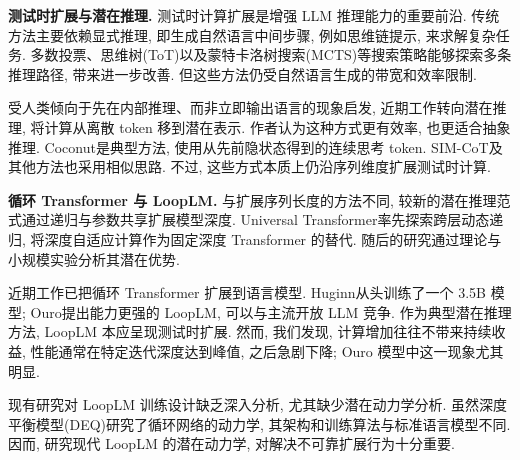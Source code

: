 \label{stars-sec-2}
\noindent\textbf{测试时扩展与潜在推理.}
测试时计算扩展是增强 LLM 推理能力的重要前沿\cite{stars-zhang2025survey}. 传统方法主要依赖显式推理, 即生成自然语言中间步骤, 例如思维链提示\cite{stars-wei2022chain}, 来求解复杂任务. 多数投票\cite{stars-wang2022selfconsistency}、思维树(ToT)\cite{stars-tot}以及蒙特卡洛树搜索(MCTS)\cite{stars-yang2022chain}等搜索策略能够探索多条推理路径, 带来进一步改善. 但这些方法仍受自然语言生成的带宽和效率限制.

受人类倾向于先在内部推理、而非立即输出语言的现象启发\cite{stars-zelikman2024quiet}, 近期工作转向潜在推理, 将计算从离散 token 移到潜在表示\cite{stars-zhu2025survey}. 作者认为这种方式更有效率, 也更适合抽象推理. Coconut\cite{stars-hao2024training}是典型方法, 使用从先前隐状态得到的连续思考 token. SIM-CoT\cite{stars-wei2025sim}及其他方法\cite{stars-mohtashami2023cotformer,stars-shen2025codi,stars-cheng2024compressed,stars-zhang2025lightthinker}也采用相似思路. 不过, 这些方式本质上仍沿序列维度扩展测试时计算.

\noindent\textbf{循环 Transformer 与 LoopLM.}
与扩展序列长度的方法不同, 较新的潜在推理范式通过递归与参数共享扩展模型深度. Universal Transformer\cite{stars-dehghani2018universal}率先探索跨层动态递归, 将深度自适应计算作为固定深度 Transformer 的替代. 随后的研究\cite{stars-giannou2023looped,stars-yang2023looped,stars-fan2024looped}通过理论与小规模实验分析其潜在优势.

近期工作\cite{stars-geiping2025scaling,stars-zhu2025scaling,stars-du2025latent,stars-mcleish2025teaching}已把循环 Transformer 扩展到语言模型. Huginn\cite{stars-geiping2025scaling}从头训练了一个 3.5B 模型; Ouro\cite{stars-zhu2025scaling}提出能力更强的 LoopLM, 可以与主流开放 LLM 竞争. 作为典型潜在推理方法, LoopLM 本应呈现测试时扩展. 然而, 我们发现, 计算增加往往不带来持续收益, 性能通常在特定迭代深度达到峰值, 之后急剧下降; Ouro 模型中这一现象尤其明显.

现有研究对 LoopLM 训练设计缺乏深入分析, 尤其缺少潜在动力学分析. 虽然深度平衡模型(DEQ)\cite{stars-bai2019deep,stars-bai2021stabilizing}研究了循环网络的动力学, 其架构和训练算法与标准语言模型不同. 因而, 研究现代 LoopLM 的潜在动力学, 对解决不可靠扩展行为十分重要.

